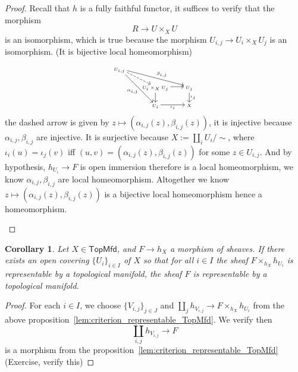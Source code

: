 \documentclass{tufte-book} %
\numberwithin{dummy}{section}
\newtheorem{cor}[thm]{Corollary}
\newcommand{\lrta}{\longrightarrow}
\begin{document}
\begin{proof}
Recall that $h$ is a fully faithful functor, it suffices to verify that the morphism
$$
R\lrta U\times_X U
$$ is an isomorphism, which is true because the morphism $U_{i,j}\lrta U_i\times_X U_j$ is an isomorphism. (It is bijective local homeomorphism)
\begin{marginfigure}[-4\baselineskip]
{\color{gray}
$$
\tiny
\begin{tikzcd}
U_{i,j} \arrow[rdd, "\alpha_{i,j}"'] \arrow[rrd, "\beta_{i,j}"] \arrow[rd, dashed] &  &  \\
 & U_i\times_X U_j \arrow[d] \arrow[r] & U_j \arrow[d, "\iota_j"] \\
 & U_i \arrow[r, "\iota_i"'] & X
\end{tikzcd}
$$
\label{fig:marginfig}
the dashed arrow is given by $z\longmapsto (\alpha_{i,j}(z),\beta_{i,j}(z))$, it is injective because $\alpha_{i,j},\beta_{i,j}$ are injective. It is surjective because $X:=\coprod_i U_i/\sim$, where $\iota_i(u)=\iota_j(v)$ iff
$(u,v)=(\alpha_{i,j}(z),\beta_{i,j}(z))$ for some $z\in U_{i,j}$. And by hypothesis, $h_{U_i}\lrta F$ is open immersion therefore is a local homeomorphism, we know $\alpha_{i,j},\beta_{i,j}$ are local homeomorphism. Altogether we know $z\mapsto (\alpha_{i,j}(z),\beta_{i,j}(z))$ is a bijective local homeomorphism hence a homeomorphism.
}
\end{marginfigure}
\end{proof}
\begin{cor}\label{cor:criterion_representable}
Let $X\in\mathsf{TopMfd}$, and $F\lrta h_X$ a morphism of sheaves. If there exists an open covering $\{U_i\}_{i\in I}$ of $X$ so that for all $i\in I$ the sheaf $F\times_{h_X} h_{U_i}$ is representable by a topological manifold, the sheaf $F$ is representable by a topological manifold.
\end{cor}
\begin{proof}
For each $i\in I$, we choose $\{V_{i,j}\}_{j\in J}$ and $\coprod_j h_{V_{i,j}}\lrta F\times_{h_X} h_{U_i}$ from the above proposition~\ref{lem:criterion_representable_TopMfd}. We verify then
$$
\coprod_{i,j}h_{V_{i,j}}\lrta F
$$
is a morphism from the proposition~\ref{lem:criterion_representable_TopMfd}(Exercise, verify this)
\end{proof}
\end{document}
